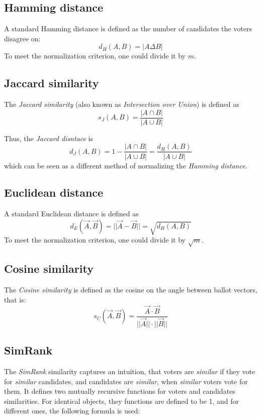 \documentclass[en]{pracamgr}
\begin{document}
\subsection{Hamming distance}

A standard Hamming distance is defined as the number of candidates the voters
disagree on:
\[ d_H(A,B) = |A \Delta B| \]
To meet the normalization criterion, one could divide it by $m$.

\subsection{Jaccard similarity}

The \textit{Jaccard similarity} (also known as \textit{Intersection over Union})
is defined as
\[ s_J(A,B) = \frac{|A \cap B|}{|A \cup B|} \]

Thus, the \textit{Jaccard disntace} is
\[ d_J(A,B) = 1-\frac{|A \cap B|}{|A \cup B|} = \frac{d_H(A,B)}{|A \cup B|} \]
which can be seen as a different method of normalizing the
\textit{Hamming distance}.

\subsection{Euclidean distance}

A standard Euclidean distance is defined as
\[ d_E(\vec A, \vec B) = ||\vec A - \vec B|| = \sqrt{d_H(A,B)} \]
To meet the normalization criterion, one could divide it by $\sqrt m$.

\subsection{Cosine similarity}

The \textit{Cosine similarity} is defined as the cosine on the angle between
ballot vectors, that is:
\[ s_C(\vec A, \vec B) = \frac{\vec A \cdot \vec B}{||\vec A||\cdot||\vec B||} \]

%

\subsection{SimRank}

The \textit{SimRank} similarity captures an intuition, that voters are
\textit{similar} if they vote for \textit{similar} candidates, and candidates
are \textit{similar}, when \textit{similar} voters vote for them. It defines two
mutually recursive functions for voters and candidates similarities. For
identical objects, they functions are defined to be 1, and for different ones,
the following formula is used:
\end{document}
